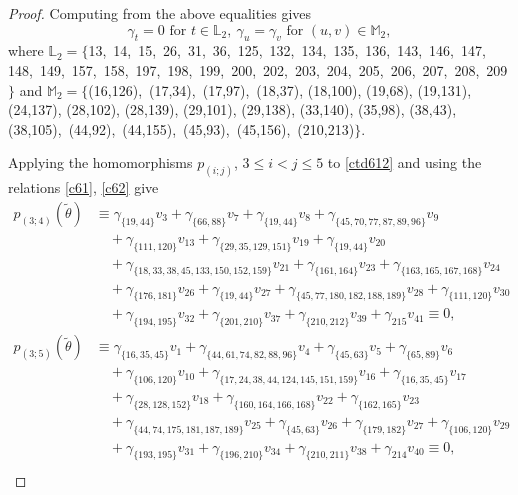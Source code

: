 \documentclass[reqno]{amsart}
\theoremstyle{plain}
\theoremstyle{definition}
\theoremstyle{plain}
\theoremstyle{definition}
\numberwithin{equation}{section}
\begin{document}
\begin{proof}
Computing from the above equalities gives
\begin{equation}\label{c62}
\gamma_t = 0 \mbox{ for } t \in \mathbb L_2,\ \gamma_u= \gamma_v \mbox{ for } (u,v) \in \mathbb M_2,
\end{equation}
where $\mathbb L_2 = \{$13,\, 14,\, 15,\, 26,\, 31,\, 36,\, 125,\, 132,\, 134,\, 135,\, 136,\, 143,\, 146,\, 147,\, 148,\, 149,\, 157,\, 158,\, 197,\, 198,\, 199,\, 200,\, 202,\, 203,\, 204,\, 205,\, 206,\, 207,\, 208,\, 209$\}$ and $\mathbb M_2 = \{$(16,126),\, (17,34),\, (17,97),\, (18,37), (18,100), (19,68), (19,131), (24,137), (28,102), (28,139), (29,101), (29,138), (33,140), (35,98), (38,43), (38,105),\, (44,92),\, (44,155),\, (45,93),\, (45,156),\, (210,213)$\}$.

Applying the homomorphisms $p_{(i;j)}$, $3 \leqslant i < j \leqslant 5$ to \eqref{ctd612} and using the relations \eqref{c61}, \eqref{c62} give
\begin{align*}
p_{(3;4)}(\widetilde\theta) &\equiv \gamma_{\{19,44\}}v_{3} + \gamma_{\{66,88\}}v_{7} + \gamma_{\{19,44\}}v_{8} + \gamma_{\{45,70,77,87,89,96\}}v_{9}\\ 
&\quad + \gamma_{\{111,120\}}v_{13} + \gamma_{\{29,35,129,151\}}v_{19} + \gamma_{\{19,44\}}v_{20}\\ 
&\quad + \gamma_{\{18,33,38,45,133,150,152,159\}}v_{21} + \gamma_{\{161,164\}}v_{23} + \gamma_{\{163,165,167,168\}}v_{24}\\ 
&\quad + \gamma_{\{176,181\}}v_{26} + \gamma_{\{19,44\}}v_{27} + \gamma_{\{45,77,180,182,188,189\}}v_{28} + \gamma_{\{111,120\}}v_{30}\\ 
&\quad + \gamma_{\{194,195\}}v_{32} + \gamma_{\{201,210\}}v_{37} + \gamma_{\{210,212\}}v_{39} + \gamma_{215}v_{41} \equiv 0,\\
p_{(3;5)}(\widetilde\theta) &\equiv \gamma_{\{16,35,45\}}v_{1} + \gamma_{\{44,61,74,82,88,96\}}v_{4} + \gamma_{\{45,63\}}v_{5} + \gamma_{\{65,89\}}v_{6}\\ 
&\quad + \gamma_{\{106,120\}}v_{10} + \gamma_{\{17,24,38,44,124,145,151,159\}}v_{16} + \gamma_{\{16,35,45\}}v_{17}\\ 
&\quad + \gamma_{\{28,128,152\}}v_{18} + \gamma_{\{160,164,166,168\}}v_{22} + \gamma_{\{162,165\}}v_{23}\\ 
&\quad + \gamma_{\{44,74,175,181,187,189\}}v_{25} + \gamma_{\{45,63\}}v_{26} + \gamma_{\{179,182\}}v_{27} + \gamma_{\{106,120\}}v_{29}\\ 
&\quad + \gamma_{\{193,195\}}v_{31} + \gamma_{\{196,210\}}v_{34} + \gamma_{\{210,211\}}v_{38} + \gamma_{214}v_{40} \equiv 0,\\

\end{align*}
\end{proof}
\end{document}

